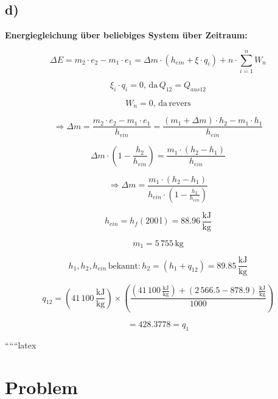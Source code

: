 

\subsection*{d)}

\textbf{Energiegleichung über beliebiges System über Zeitraum:}

\[
\Delta E = m_2 \cdot e_2 - m_1 \cdot e_1 = \Delta m \cdot (h_{ein} + \xi \cdot q_i) + n \cdot \sum_{i=1}^{n} W_{n}
\]

\[
\xi_i \cdot q_i = 0, \, \text{da} \, Q_{12} = Q_{aus12}
\]

\[
W_{n} = 0, \, \text{da} \, \text{revers}
\]

\[
\Rightarrow \Delta m = \frac{m_2 \cdot e_2 - m_1 \cdot e_1}{h_{ein}} = \frac{(m_1 + \Delta m) \cdot h_{2} - m_1 \cdot h_{1}}{h_{ein}}
\]

\[
\Delta m \cdot (1 - \frac{h_{2}}{h_{ein}}) = \frac{m_1 \cdot (h_{2} - h_{1})}{h_{ein}}
\]

\[
\Rightarrow \Delta m = \frac{m_1 \cdot (h_{2} - h_{1})}{h_{ein} \cdot (1 - \frac{h_{2}}{h_{ein}})}
\]

\[
h_{ein} = h_{f} (200 \, \text{l}) = 88.96 \, \frac{\text{kJ}}{\text{kg}}
\]

\[
m_1 = 5 \, 755 \, \text{kg}
\]

\[
h_{1}, h_{2}, h_{ein} \, \text{bekannt:} \, h_{2} = (h_{1} + q_{12}) = 89.85 \, \frac{\text{kJ}}{\text{kg}}
\]

\[
q_{12} = (41 \, 100 \, \frac{\text{kJ}}{\text{kg}}) \times \left( \frac{(41 \, 100 \, \frac{\text{kJ}}{\text{kg}}) + (2 \, 566.5 - 878.9) \, \frac{\text{kJ}}{\text{kg}}}{1000} \right)
\]

\[
= 428.3778 = q_{1}
\]

``````latex


\section*{Problem}
